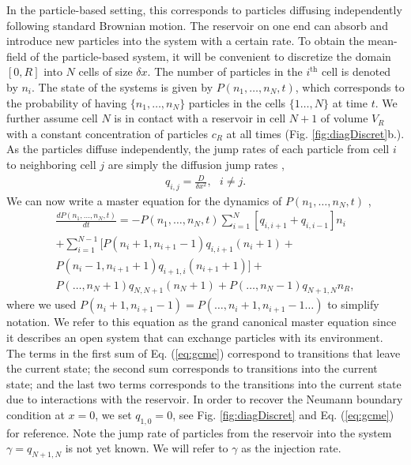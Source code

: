 \documentclass[10pt,twocolumn]{revtex4-1}
\begin{document}
	In the particle-based setting, this corresponds to particles diffusing independently following standard Brownian motion. The reservoir on one end can absorb and introduce new particles into the system with a certain rate. To obtain the mean-field of the particle-based system, it will be convenient to discretize the domain $[0,R]$ into $N$ cells of size $\delta x$. The number of particles in the $i^{\text{th}}$ cell is denoted by $n_i$. The state of the systems is given by $P(n_1,\dots,n_N,t)$, which corresponds to the probability of having $\{n_1,\dots,n_N\}$ particles in the cells $\{1\dots,N\}$ at time $t$. We further assume cell $N$ is in contact with a reservoir in cell $N+1$ of volume $V_R$ with a constant concentration of particles $c_R$ at all times (Fig. \ref{fig:diagDiscret}b.). As the particles diffuse independently, the jump rates of each particle from cell $i$ to neighboring cell $j$ are simply the diffusion jump rates \cite{del2018grand},
	\begin{align}
	q_{i,j}=\frac{D}{\delta x ^{2}}, \ \ \ i\neq j.
	\label{eq:SMErates}
	\end{align}
	We can now write a master equation for the dynamics of $P(n_1,\dots,n_N,t)$ \cite{del2018grand},
	\small
	\begin{gather}
	\frac{d P(n_1,\dots,n_N,t)}{dt} = -P(n_1,\dots,n_N,t)\sum_{i=1}^N[q_{i,i+1} + q_{i,i-1}]n_i \nonumber\\
	+ \sum_{i=1}^{N-1} \bigg[
	P(n_i + 1, n_{i+1} -1) q_{i,i+1} (n_i + 1) + \label{eq:gcme} \\
	P(n_i - 1, n_{i+1} + 1) q_{i+1,i} (n_{i+1} + 1) \bigg] + \nonumber\\
	P(\dots, n_N + 1) q_{N,N+1} (n_N + 1)
	+ P(\dots, n_N - 1) q_{N+1,N} n_R, \nonumber
	\end{gather}
	\normalsize
	where we used $P(n_i + 1, n_{i+1} -1) = P(\dots, n_i + 1, n_{i+1} -1 \dots)$ to simplify notation. We refer to this equation as the grand canonical master equation since it describes an open system that can exchange particles with its environment. The terms in the first sum of Eq. (\ref{eq:gcme}) correspond to transitions that leave the current state; the second sum corresponds to transitions into the current state; and the last two terms corresponds to the transitions into the current state due to interactions with the reservoir. In order to recover the Neumann boundary condition at $x=0$, we set $q_{1,0}=0$, see Fig. \ref{fig:diagDiscret} and Eq. (\ref{eq:gcme}) for reference. Note the jump rate of particles from the reservoir into the system $\gamma=q_{N+1,N}$ is not yet known. We will refer to $\gamma$ as the injection rate.
	
\end{document}
